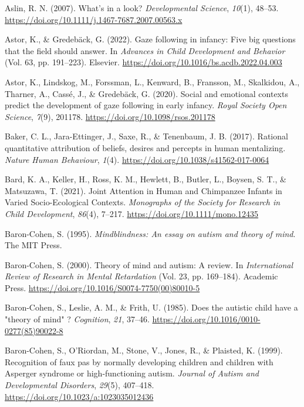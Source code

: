 \documentclass[
]{scrbook}
\newlength{\cslhangindent}
\newenvironment{CSLReferences}[2] %
 {\begin{list}{}{%
  \setlength{\itemindent}{0pt}
  \setlength{\leftmargin}{0pt}
  \setlength{\parsep}{0pt}
  \ifodd #1
   \setlength{\leftmargin}{\cslhangindent}
   \setlength{\itemindent}{-1\cslhangindent}
  \fi
  \setlength{\itemsep}{#2\baselineskip}}}
 {\end{list}}
\begin{document}
\begin{CSLReferences}{1}{0}
Aslin, R. N. (2007). What's in a look? \emph{Developmental Science}, \emph{10}(1), 48--53. \url{https://doi.org/10.1111/j.1467-7687.2007.00563.x}

Astor, K., \& Gredebäck, G. (2022). Gaze following in infancy: {Five} big questions that the field should answer. In \emph{Advances in {Child Development} and {Behavior}} (Vol. 63, pp. 191--223). Elsevier. \url{https://doi.org/10.1016/bs.acdb.2022.04.003}

Astor, K., Lindskog, M., Forssman, L., Kenward, B., Fransson, M., Skalkidou, A., Tharner, A., Cassé, J., \& Gredebäck, G. (2020). Social and emotional contexts predict the development of gaze following in early infancy. \emph{Royal Society Open Science}, \emph{7}(9), 201178. \url{https://doi.org/10.1098/rsos.201178}

Baker, C. L., Jara-Ettinger, J., Saxe, R., \& Tenenbaum, J. B. (2017). Rational quantitative attribution of beliefs, desires and percepts in human mentalizing. \emph{Nature Human Behaviour}, \emph{1}(4). \url{https://doi.org/10.1038/s41562-017-0064}

Bard, K. A., Keller, H., Ross, K. M., Hewlett, B., Butler, L., Boysen, S. T., \& Matsuzawa, T. (2021). Joint {Attention} in {Human} and {Chimpanzee Infants} in {Varied Socio-Ecological Contexts}. \emph{Monographs of the Society for Research in Child Development}, \emph{86}(4), 7--217. \url{https://doi.org/10.1111/mono.12435}

Baron-Cohen, S. (1995). \emph{Mindblindness: {An} essay on autism and theory of mind}. The MIT Press.

Baron-Cohen, S. (2000). Theory of mind and autism: {A} review. In \emph{International {Review} of {Research} in {Mental Retardation}} (Vol. 23, pp. 169--184). Academic Press. \url{https://doi.org/10.1016/S0074-7750(00)80010-5}

Baron-Cohen, S., Leslie, A. M., \& Frith, U. (1985). Does the autistic child have a "theory of mind" ? \emph{Cognition}, \emph{21}, 37--46. \url{https://doi.org/10.1016/0010-0277(85)90022-8}

Baron-Cohen, S., O'Riordan, M., Stone, V., Jones, R., \& Plaisted, K. (1999). Recognition of faux pas by normally developing children and children with {Asperger} syndrome or high-functioning autism. \emph{Journal of Autism and Developmental Disorders}, \emph{29}(5), 407--418. \url{https://doi.org/10.1023/a:1023035012436}


\end{CSLReferences}
\end{document}
